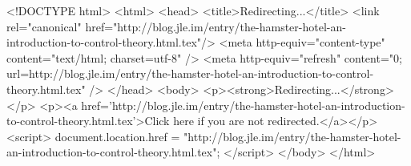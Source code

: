 <!DOCTYPE html>
<html>
<head>
<title>Redirecting...</title>
<link rel="canonical" href="http://blog.jle.im/entry/the-hamster-hotel-an-introduction-to-control-theory.html.tex"/>
<meta http-equiv="content-type" content="text/html; charset=utf-8" />
<meta http-equiv="refresh" content="0; url=http://blog.jle.im/entry/the-hamster-hotel-an-introduction-to-control-theory.html.tex" />
</head>
<body>
  <p><strong>Redirecting...</strong></p>
  <p><a href='http://blog.jle.im/entry/the-hamster-hotel-an-introduction-to-control-theory.html.tex'>Click here if you are not redirected.</a></p>
  <script>
    document.location.href = "http://blog.jle.im/entry/the-hamster-hotel-an-introduction-to-control-theory.html.tex";
  </script>
</body>
</html>

